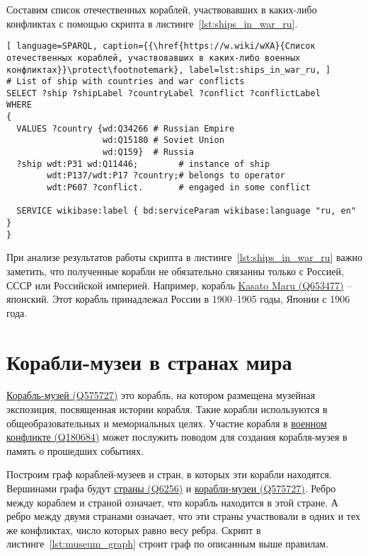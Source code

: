 Составим список отечественных кораблей, участвовавших в каких-либо конфликтах с помощью скрипта в листинге~\ref{lst:ships_in_war_ru}.

\begin{lstlisting}[ language=SPARQL, caption={{\href{https://w.wiki/wXA}{Список отечественных кораблей, участвовавших в каких-либо военных конфликтах}}\protect\footnotemark}, label=lst:ships_in_war_ru, ]
# List of ship with countries and war conflicts
SELECT ?ship ?shipLabel ?countryLabel ?conflict ?conflictLabel
WHERE
{
  VALUES ?country {wd:Q34266 # Russian Empire
                   wd:Q15180 # Soviet Union
                   wd:Q159}  # Russia
  ?ship wdt:P31 wd:Q11446;        # instance of ship
        wdt:P137/wdt:P17 ?country;# belongs to operator
        wdt:P607 ?conflict.       # engaged in some conflict

  SERVICE wikibase:label { bd:serviceParam wikibase:language "ru, en" }
}
\end{lstlisting}

При анализе результатов работы скрипта в листинге~\ref{lst:ships_in_war_ru} важно заметить, что полученные корабли не обязательно связанны только с Россией, СССР или Российской империей. Например, корабль \href{https://www.wikidata.org/wiki/Q653477}{Kasato Maru (Q653477)} -- японский. Этот корабль принадлежал России в 1900--1905 годы, Японии с 1906 года.

\section{Корабли-музеи в странах мира}

\href{https://www.wikidata.org/wiki/Q575727}{Корабль-музей (Q575727)} это корабль, на котором размещена музейная экспозиция, посвященная истории корабля. Такие корабли используются в общеобразовательных и мемориальных целях. Участие корабля в \href{https://www.wikidata.org/wiki/Q180684}{военном конфликте (Q180684)} может послужить поводом для создания корабля-музея в память о прошедших событиях. 

Построим граф кораблей-музеев и стран, в которых эти корабли находятся. Вершинами графа будут \href{https://www.wikidata.org/wiki/Q6256}{страны (Q6256)} и \href{https://www.wikidata.org/wiki/Q575727}{корабли-музеи (Q575727)}. Ребро между кораблем и страной означает, что корабль находится в этой стране. А ребро между двумя странами означает, что эти страны участвовали в одних и тех же конфликтах, число которых равно весу ребра. Скрипт в листинге~\ref{lst:museum_graph} строит граф по описанным выше правилам.

